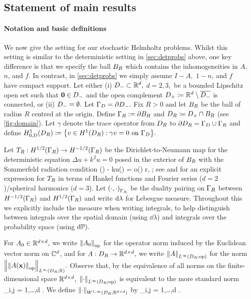 \subsection{Statement of main results}\label{sec:hh-results}

\paragraph{Notation and basic definitions} We now give the setting for our stochastic Helmholtz problems. Whilst this setting is similar to the deterministic setting in \cref{sec:detprobs} above, one key difference is that we specify the ball $B_{R}$ which contains the inhomogeneities in $A$, $n$, and $f$. In contrast, in \cref{sec:detprobs} we simply assume $I-A,$ $1-n$, and $f$ have compact support. Let either (i) $D_{-} \subset \mathbb R^{d},$ $d=2,3,$ be a bounded Lipschitz open set such that $\mathbf{0} \in D_{-}$ and the open complement $D_{+}\coloneqq \mathbb R^d\setminus \overline{D_{-}}$ is connected, or (ii) $D_{-} = \emptyset.$ Let $\Gamma_{D} = \partial D_{-}.$ 
Fix $R>0$ and let $B_{R}$ be the ball of radius $R$ centred at the origin. Define $\Gamma_{R} := \partial B_{R}$ and $D_{R} \coloneqq D_{+} \cap B_{R}$ (see \cref{fig:domain}). Let $\gamma$ denote the trace operator from $D_{R}$ to $\partial D_{R} = \Gamma_{D} \cup \Gamma_{R}$ and define $\HozDDR \de \set{v \in \HoDR \st \gamma v = 0 \ton \GD}.$ 
 
Let $T_{R}: H^{1/2}(\Gamma_R) \rightarrow H^{-1/2}(\Gamma_R)$ be the Dirichlet-to-Neumann map for the deterministic equation $\Delta u+k^2 u=0$ posed in the exterior of $B_{R}$ with the Sommerfeld radiation condition 
\beq\label{eq:src}
(\bx) - \ri ku(\bx) = o\mleft(\mright)  r\de\abs{\bx}\rightarrow \infty,  \frac{\bx}{\abs{\bx}};
\eeq
see \cite[Section 2.6.3]{Ne:01} and \cite[Equations 3.5 and 3.6]{ChMo:08} for an explicit expression for $T_{R}$  in terms of Hankel functions and Fourier series ($d=2$)/spherical harmonics ($d=3$). Let $\IPGR{\cdot}{\cdot}$ be the duality pairing on $\Gamma_{R}$ between $\HmhGR$ and $\HhGR$ and write $\mathrm{d}\lambda$ for Lebesgue measure. Throughout this  we explicitly include the measure when writing integrals, to help distinguish between integrals over the spatial domain (using $\dd\lambda$) and integrals over the probability space (using $\mathrm{d}\mathbb P).$

For $A_{0} \in \mathbb R^{d\times d},$ we write $\NopCCd{\Az}$ for the operator norm induced by the Euclidean vector norm on $\mathbb C^{d}$, and for $A:D_{R} \rightarrow \mathbb R^{d\times d},$ we write $\NLiDRop{A}$ for the norm $\NLiDRRR{\Nop{A(\bx)}}.$ Observe that, by the equivalence of all norms on the finite-dimensional space $\mathbb R^{d\times d},$ $\NLiDRop{\cdot}$ is equivalent to the more standard norm
\beq\label{eq:ineditsnorm1}
 \de \sup_{i,j = 1,\ldots,d} .
\eeq
We define $\NWoiDRRRdtd{\cdot}$ by
\beq\label{eq:ineditsnorm2}
 \de \sup_{i,j = 1,\ldots,d} .
\eeq

